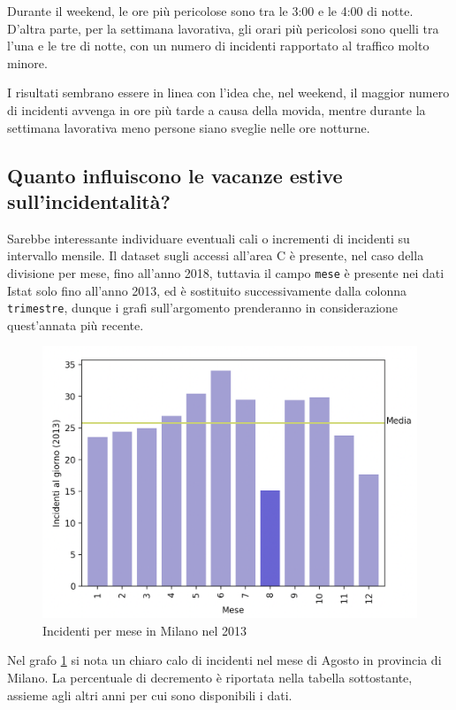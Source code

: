 \documentclass[a4paper,12pt]{report}
\newcommand{\columnstyle}[1]{\texttt{#1}}
\begin{document}
Durante il weekend, le ore più pericolose sono tra le 3:00 e le 4:00 di notte. 
D'altra parte, per la settimana lavorativa, gli orari più pericolosi sono quelli 
tra l'una e le tre di notte, con un numero di incidenti rapportato al 
traffico molto minore. 

I risultati sembrano essere in linea con l'idea che, nel weekend, il maggior 
numero di incidenti avvenga in ore più tarde a causa della movida, mentre durante 
la settimana lavorativa meno persone siano sveglie nelle ore notturne.

\subsection{Quanto influiscono le vacanze estive sull'incidentalità?}

Sarebbe interessante individuare eventuali cali o incrementi di incidenti 
su intervallo mensile.
Il dataset sugli accessi all'area C è presente, nel caso della divisione per 
mese, fino all'anno 2018, tuttavia il campo \columnstyle{mese} è presente nei 
dati Istat solo fino all'anno 2013, ed è sostituito successivamente 
dalla colonna \columnstyle{trimestre}, dunque i grafi sull'argomento prenderanno 
in considerazione quest'annata più recente.

\begin{figure}
    \includegraphics[width=\linewidth]{../src/incidenti/incidenti_senza_coords/mese_incidenti/milano_mese.png}
    \caption{Incidenti per mese in Milano nel 2013}
    \label{fig:milano-mese}
\end{figure}

Nel grafo \ref{fig:milano-mese} si nota un chiaro calo di incidenti nel mese di 
Agosto in provincia di Milano. 
La percentuale di decremento è riportata nella tabella sottostante, assieme agli 
altri anni per cui sono disponibili i dati.
\end{document}
